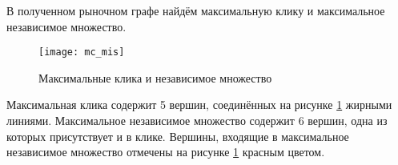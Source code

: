 В полученном рыночном графе найдём максимальную клику и максимальное независимое множество.

\begin{figure}[H]
\centering
\texttt{[image: mc\_mis]}
\caption{Максимальные клика и независимое множество}
\label{fig:mc_mis}
\end{figure}

Максимальная клика содержит 5 вершин, соединённых на рисунке \ref{fig:mc_mis} жирными линиями. Максимальное независимое множество содержит 6 вершин, одна из которых присутствует и в клике. Вершины, входящие в максимальное независимое множество отмечены на рисунке \ref{fig:mc_mis}  красным цветом.





